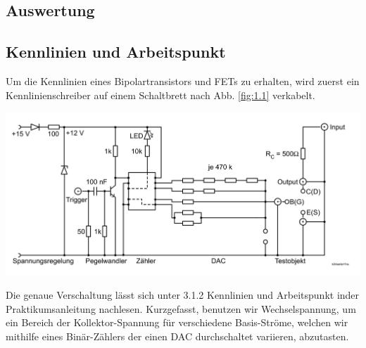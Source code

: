 \documentclass[10pt]{article}
\newenvironment{Figure}
  {\par\medskip\noindent\minipage{\linewidth}}
  {\endminipage\par\medskip}
\begin{document}
\begin{multicols}{2}
	\section{Auswertung}
	\subsection{Kennlinien und Arbeitspunkt}
	Um die Kennlinien eines Bipolartransistors und FETs zu erhalten, wird zuerst ein Kennlinienschreiber auf einem Schaltbrett nach Abb. \ref{fig:1.1} verkabelt.
	\begin{Figure}
		\centering\includegraphics[width=1\textwidth]{kennlinienschreiber.png}
		\label{fig:1.1}
	\end{Figure}
	Die genaue Verschaltung lässt sich unter 3.1.2 Kennlinien und Arbeitspunkt\cite{Praktikumsanleitung} inder Praktikumsanleitung nachlesen.
	Kurzgefasst, benutzen wir Wechselspannung, um ein Bereich der Kollektor-Spannung für verschiedene Basis-Ströme, welchen wir mithilfe eines Binär-Zählers der einen DAC durchschaltet variieren, abzutasten.


\end{multicols}
\end{document}

